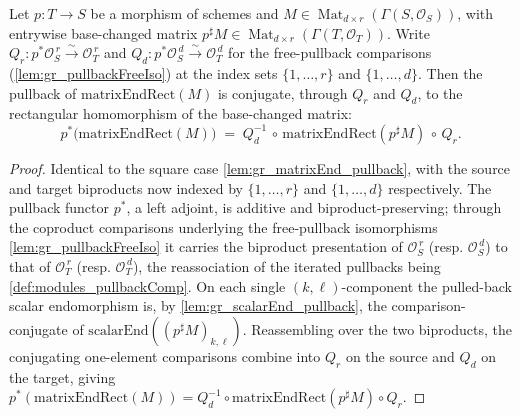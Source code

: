 \begin{lemma}


  \label{lem:gr_matrixEndRect_pullback}
  Let \(p : T \to S\) be a morphism of schemes and
  \(M \in \operatorname{Mat}_{d\times r}(\Gamma(S,\mathcal{O}_S))\), with entrywise
  base-changed matrix \(p^{\sharp}M \in \operatorname{Mat}_{d\times r}(\Gamma(T,\mathcal{O}_T))\).
  Write \(Q_r : p^{*}\mathcal{O}_S^{\,r} \xrightarrow{\sim} \mathcal{O}_T^{\,r}\) and
  \(Q_d : p^{*}\mathcal{O}_S^{\,d} \xrightarrow{\sim} \mathcal{O}_T^{\,d}\) for the
  free-pullback comparisons (\cref{lem:gr_pullbackFreeIso}) at the index sets
  \(\{1,\dots,r\}\) and \(\{1,\dots,d\}\). Then the pullback of
  \(\mathrm{matrixEndRect}(M)\) is conjugate, through \(Q_r\) and \(Q_d\), to the
  rectangular homomorphism of the base-changed matrix:
  \[
    p^{*}\bigl(\mathrm{matrixEndRect}(M)\bigr)
      \;=\; Q_d^{-1} \,\circ\, \mathrm{matrixEndRect}(p^{\sharp}M) \,\circ\, Q_r .
  \]
\end{lemma}
\begin{proof}
    \leanok
  Identical to the square case \cref{lem:gr_matrixEnd_pullback}, with the source and target
  biproducts now indexed by \(\{1,\dots,r\}\) and \(\{1,\dots,d\}\) respectively. The
  pullback functor \(p^{*}\), a left adjoint, is additive and biproduct-preserving; through
  the coproduct comparisons underlying the free-pullback isomorphisms
  \cref{lem:gr_pullbackFreeIso} it carries the biproduct presentation of
  \(\mathcal{O}_S^{\,r}\) (resp. \(\mathcal{O}_S^{\,d}\)) to that of \(\mathcal{O}_T^{\,r}\)
  (resp. \(\mathcal{O}_T^{\,d}\)), the reassociation of the iterated pullbacks being
  \cref{def:modules_pullbackComp}. On each single \((k,\ell)\)-component the pulled-back
  scalar endomorphism is, by \cref{lem:gr_scalarEnd_pullback}, the comparison-conjugate of
  \(\mathrm{scalarEnd}((p^{\sharp}M)_{k,\ell})\). Reassembling over the two biproducts, the
  conjugating one-element comparisons combine into \(Q_r\) on the source and \(Q_d\) on the
  target, giving \(p^{*}(\mathrm{matrixEndRect}(M)) = Q_d^{-1}\circ
  \mathrm{matrixEndRect}(p^{\sharp}M)\circ Q_r\).
\end{proof}

